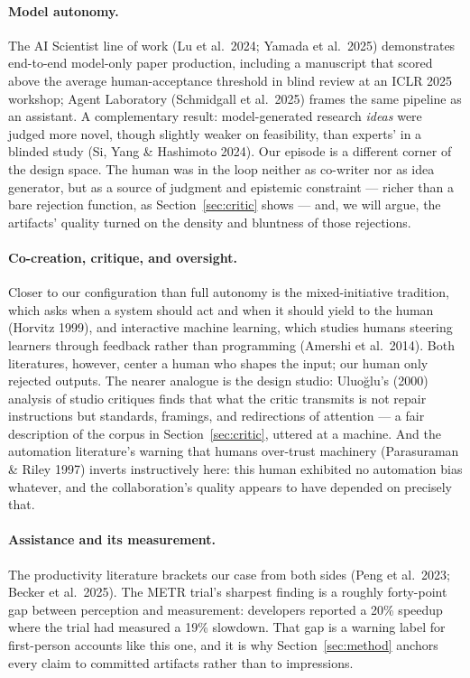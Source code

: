 \documentclass[11pt]{article}
\begin{document}
\paragraph{Model autonomy.} The AI Scientist line of work (Lu et al.\ 2024; Yamada et al.\ 2025) demonstrates end-to-end model-only paper production, including a manuscript that scored above the average human-acceptance threshold in blind review at an ICLR 2025 workshop; Agent Laboratory (Schmidgall et al.\ 2025) frames the same pipeline as an assistant. A complementary result: model-generated research \emph{ideas} were judged more novel, though slightly weaker on feasibility, than experts' in a blinded study (Si, Yang \& Hashimoto 2024). Our episode is a different corner of the design space. The human was in the loop neither as co-writer nor as idea generator, but as a source of judgment and epistemic constraint — richer than a bare rejection function, as Section~\ref{sec:critic} shows — and, we will argue, the artifacts' quality turned on the density and bluntness of those rejections.

\paragraph{Co-creation, critique, and oversight.} Closer to our configuration than full autonomy is the mixed-initiative tradition, which asks when a system should act and when it should yield to the human (Horvitz 1999), and interactive machine learning, which studies humans steering learners through feedback rather than programming (Amershi et al.\ 2014). Both literatures, however, center a human who shapes the input; our human only rejected outputs. The nearer analogue is the design studio: Uluoğlu's (2000) analysis of studio critiques finds that what the critic transmits is not repair instructions but standards, framings, and redirections of attention — a fair description of the corpus in Section~\ref{sec:critic}, uttered at a machine. And the automation literature's warning that humans over-trust machinery (Parasuraman \& Riley 1997) inverts instructively here: this human exhibited no automation bias whatever, and the collaboration's quality appears to have depended on precisely that.

\paragraph{Assistance and its measurement.} The productivity literature brackets our case from both sides (Peng et al.\ 2023; Becker et al.\ 2025). The METR trial's sharpest finding is a roughly forty-point gap between perception and measurement: developers reported a 20\% speedup where the trial had measured a 19\% slowdown. That gap is a warning label for first-person accounts like this one, and it is why Section~\ref{sec:method} anchors every claim to committed artifacts rather than to impressions.
\end{document}
